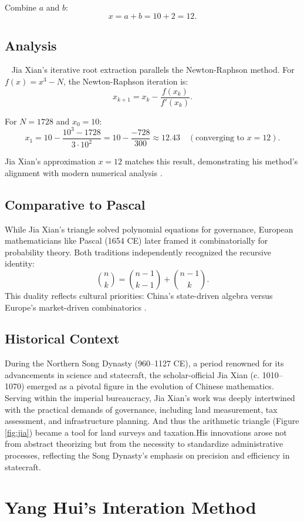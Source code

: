 \documentclass{article}
\begin{document}
~

Combine \( a \) and \( b \):
\[
x = a + b = 10 + 2 = \boxed{12}.
\]
\subsection{Analysis}
~
Jia Xian's iterative root extraction parallels the Newton-Raphson method. For \( f(x) = x^3 - N \), the Newton-Raphson iteration is:
\[
x_{k+1} = x_k - \frac{f(x_k)}{f'(x_k)}.
\]

For \( N = 1728 \) and \( x_0 = 10 \):
\[
x_1 = 10 - \frac{10^3 - 1728}{3 \cdot 10^2} = 10 - \frac{-728}{300} \approx 12.43 \quad (\text{converging to } x = 12).
\]

Jia Xian’s approximation \( x = 12 \) matches this result, demonstrating his method’s alignment with modern numerical analysis 
\citep{lam1986}.

\subsection{Comparative to Pascal}

While Jia Xian’s triangle solved polynomial equations for governance, European mathematicians like Pascal (1654 CE) later framed it combinatorially for probability theory. Both traditions independently recognized the recursive identity:
\[
\binom{n}{k} = \binom{n-1}{k-1} + \binom{n-1}{k}.
\]
This duality reflects cultural priorities: China’s state-driven algebra versus Europe’s market-driven combinatorics \citep{boyer1950, hinz1992}.

\subsection{Historical Context}
During the Northern Song Dynasty (960–1127 CE), a period renowned for its advancements in science and statecraft, the scholar-official Jia Xian (c. 1010–1070) emerged as a pivotal figure in the evolution of Chinese mathematics. Serving within the imperial bureaucracy, Jia Xian’s work was deeply intertwined with the practical demands of governance, including land measurement, tax assessment, and infrastructure planning. And thus the arithmetic triangle (Figure \ref{fig:jia}) became a tool for land surveys and taxation.His innovations arose not from abstract theorizing but from the necessity to standardize administrative processes, reflecting the Song Dynasty’s emphasis on precision and efficiency in statecraft.


\section{Yang Hui’s Interation Method}
\end{document}
